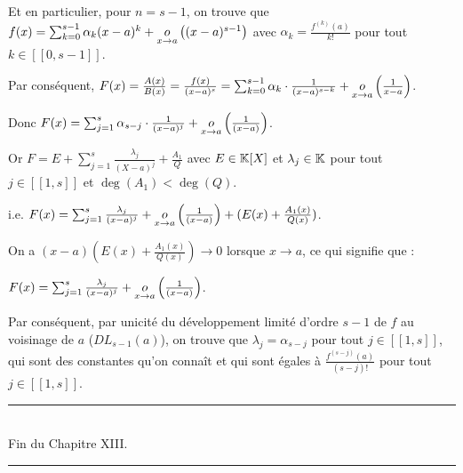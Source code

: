 \documentclass[12pt, a4paper]{report}
\begin{document}
Et en particulier, pour $n=s-1$, on trouve que $f(x)=\sum_{k=0}^{s-1} \alpha_k(x-a)^k + \underset{x\to a}{o}\left((x-a)^{s-1}\right)$ avec $\alpha_k = \frac{f^{(k)}(a)}{k!}$ pour tout $k \in [\![0,s-1]\!]$.

Par conséquent, $F(x) = \frac{A(x)}{B(x)} = \frac{f(x)}{(x-a)^s} = \sum_{k=0}^{s-1} \alpha_k \cdot \frac{1}{(x-a)^{s-k}} + \underset{x\to a}{o}\left(\frac{1}{x-a}\right)$.

Donc $F(x)=\sum_{j=1}^s \alpha_{s-j} \cdot \frac{1}{(x-a)^j} + \underset{x\to a}{o}\left(\frac{1}{(x-a)}\right)$.

Or $F = E+\sum_{j=1}^s \frac{\lambda_j}{(X-a)^j} + \frac{A_1}Q$ avec $E \in \mathbb{K}[X]$ et $\lambda_j \in \mathbb{K}$ pour tout $j \in [\![1,s]\!]$ et $\deg(A_1) < \deg(Q)$.

i.e. $F(x) = \sum_{j=1}^s \frac{\lambda_j}{(x-a)^j} + \underset{x\to a}{o}\left(\frac{1}{(x-a)}\right)+(E(x) + \frac{A_1(x)}{Q(x)})$.

On a $(x-a)(E(x)+\frac{A_1(x)}{Q(x)}) \to 0$ lorsque $x \to a$, ce qui signifie que :

$F(x) = \sum_{j=1}^s \frac{\lambda_j}{(x-a)^j} + \underset{x\to a}{o}\left(\frac{1}{(x-a)}\right)$.

Par conséquent, par unicité du développement limité d'ordre $s-1$ de $f$ au voisinage de $a$ ($DL_{s-1}(a)$), on trouve que $\lambda_j = \alpha_{s-j}$ pour tout $j \in [\![1,s]\!]$, qui sont des constantes qu'on connaît et qui sont égales à $\frac{f^{(s-j)}(a)}{(s-j)!}$ pour tout $j \in [\![1,s]\!]$.

\begin{center}
    \rule{0.5\textwidth}{1pt}\\
    Fin du Chapitre XIII.\\
    \rule{0.5\textwidth}{1pt}
\end{center}
\end{document}
